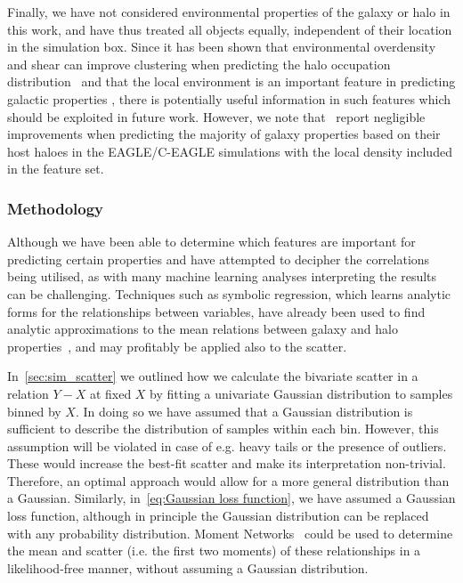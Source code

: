 \documentclass[usenatbib,useAMS]{mnras}
\begin{document}
Finally, we have not considered environmental properties of the galaxy or halo in this work, and have thus treated all objects equally, independent of their location in the simulation box. Since it has been shown that environmental overdensity and shear can improve clustering when predicting the halo occupation distribution~\citep{Delgado_2021} and that the local environment is an important feature in predicting galactic properties \citep{Agarwal_2018}, there is potentially useful information in such features which should be exploited in future work. However, we note that~\cite{Lovell_2021} report negligible improvements when predicting the majority of galaxy properties based on their host haloes in the EAGLE/C-EAGLE simulations with the local density included in the feature set.

\subsubsection{Methodology}

Although we have been able to determine which features are important for predicting certain properties and have attempted to decipher the correlations being utilised, as with many machine learning analyses interpreting the results can be challenging. Techniques such as symbolic regression, which learns analytic forms for the relationships between variables, have already been used to find analytic approximations to the mean relations between galaxy and halo properties~\citep{Shao_2021,Delgado_2021}, and may profitably be applied also to the scatter.

In~\cref{sec:sim_scatter} we outlined how we calculate the bivariate scatter in a relation $Y-X$ at fixed $X$ by fitting a univariate Gaussian distribution to samples binned by $X$. In doing so we have assumed that a Gaussian distribution is sufficient to describe the distribution of samples within each bin. However, this assumption will be violated in case of e.g. heavy tails or the presence of outliers. These would increase the best-fit scatter and make its interpretation non-trivial. Therefore, an optimal approach would allow for a more general distribution than a Gaussian. Similarly, in~\cref{eq:Gaussian loss function}, we have assumed a Gaussian loss function, although in principle the Gaussian distribution can be replaced with any probability distribution. Moment Networks~\citep{Jeffrey_2020} could be used to determine the mean and scatter (i.e. the first two moments) of these relationships in a likelihood-free manner, without assuming a Gaussian distribution.
\end{document}
